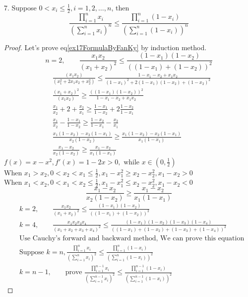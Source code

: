 \begin{example}
	7. Suppose $ 0<x_i\leqslant \frac{1}{2}, i=1,2,\dots,n $, then
	\begin{equation}\label{ex17FormulaByFanKy}
		\frac{\prod_{i=1}^n x_i}{(\sum_{i=1}^n x_i)^n} \leqslant \frac{\prod_{i=1}^n(1-x_i)}{(\sum_{i=1}^n(1-x_i))^n}
	\end{equation}
\begin{proof}
	Let's prove eq\ref{ex17FormulaByFanKy} by induction method.
	\begin{equation*}
		n=2,\qquad \frac{x_1x_2}{(x_1+x_2)^2}\leqslant \frac{(1-x_1)(1-x_2)}{((1-x_1)+(1-x_2))^2}
	\end{equation*}
	\begin{align*}
		&\frac{(x_1x_2)}{(x_1^2+2x_1x_2+x_2^2)} \leqslant \frac{1-x_1-x_2+x_1x_2}{(1-x_1)^2+2(1-x_1)(1-x_2)+(1-x_2)^2}\\
		&\frac{(x_1+x_2)^2}{(x_1x_2)} \ge \frac{((1-x_1)(1-x_2))^2}{1-x_1-x_2+x_1x_2}\\
		&\frac{x_1}{x_2} + 2 + \frac{x_2}{x_1} \ge \frac{1-x_1}{1-x_2} + 2\frac{1-x_2}{1-x_1}\\
		&\frac{x_1}{x_2} - \frac{1-x_1}{1-x_2} \ge \frac{1-x_2}{1-x_1} - \frac{x_2}{x_1}\\
		&\frac{x_1(1-x_2) - x_2(1-x_1)}{x_2(1-x_2)} \ge \frac{x_1(1-x_2)-x_2(1-x_1)}{x_1(1-x_1)}\\
		&\frac{x_1-x_2}{x_2(1-x_2)} \ge \frac{x_1 - x_2}{x_1(1-x_1)}
	\end{align*}
$ f(x) = x-x^2, f'(x) = 1-2x>0,\text{ while }x\in(0,\frac{1}{2})  $\\
When $ x_1>x_2 , 0<x_2<x_1\leqslant \frac{1}{2}, x_1-x_1^2 \ge x_2-x_2^2, x_1-x_2>0$\\
When $ x_1<x_2 , 0<x_1<x_2\leqslant \frac{1}{2}, x_1-x_1^2 \leqslant x_2-x_2^2, x_1-x_2<0$\\
\begin{equation*}
	 \frac{x_1-x_2}{x_2(1-x_2)} \ge \frac{x_1 - x_2}{x_1(1-x_1)} 
\end{equation*}
\begin{align*}
	&k=2,\qquad \frac{x_1x_2}{(x_1+x_2)^2}\leqslant \frac{(1-x_1)(1-x_2)}{((1-x_1)+(1-x_2))^2}\\
	&k=4,\qquad \frac{x_1x_2x_3x_4}{(x_1+x_2+x_3+x_4)^2}\leqslant 
	\frac{(1-x_1)(1-x_2)(1-x_3)(1-x_4)}{((1-x_1)+(1-x_2)+(1-x_3)+(1-x_4))^2}\\
	&\text{Use Cauchy's forward and backward method, We can prove this equation}\\
	&\text{Suppose }k=n,\frac{\prod_{i=1}^n x_i}{(\sum_{i=1}^n x_i)^2} \leqslant 
	\frac{\prod_{i=1}^n (1-x_i)}{(\sum_{i=1}^n (1-x_i))^2}\\
	&k = n-1,\qquad \text{prove  } \frac{\prod_{i=1}^{n-1} x_i}{(\sum_{i=1}^{n-1} x_i)^2} \leqslant 
	\frac{\prod_{i=1}^{n-1} (1-x_i)}{(\sum_{i=1}^{n-1} (1-x_i))^2}
\end{align*}


\end{proof}
\end{example}
